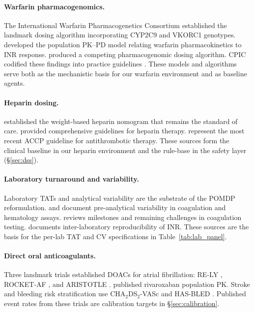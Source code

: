 \documentclass[11pt]{article}
\begin{document}
\paragraph{Warfarin pharmacogenomics.}
The International Warfarin Pharmacogenetics Consortium \citep{iwpc2009} established the landmark dosing algorithm incorporating CYP2C9 and VKORC1 genotypes. \citet{hamberg2007, hamberg2010} developed the population PK--PD model relating warfarin pharmacokinetics to INR response. \citet{gage2008} produced a competing pharmacogenomic dosing algorithm. CPIC codified these findings into practice guidelines \citep{johnson2017}. These models and algorithms serve both as the mechanistic basis for our warfarin environment and as baseline agents.

\paragraph{Heparin dosing.}
\citet{raschke1993} established the weight-based heparin nomogram that remains the standard of care. \citet{hirsh2001} provided comprehensive guidelines for heparin therapy. \citet{holbrook2012} represent the most recent ACCP guideline for antithrombotic therapy. These sources form the clinical baseline in our heparin environment and the rule-base in the safety layer (\S\ref{sec:dss}).

\paragraph{Laboratory turnaround and variability.}
Laboratory TATs and analytical variability are the substrate of the POMDP reformulation. \citet{bowen2016} and \citet{whitehead2020} document pre-analytical variability in coagulation and hematology assays. \citet{lippi2012} reviews milestones and remaining challenges in coagulation testing. \citet{vandenbesselaar2010} documents inter-laboratory reproducibility of INR. These sources are the basis for the per-lab TAT and CV specifications in Table~\ref{tab:lab_panel}.

\paragraph{Direct oral anticoagulants.}
Three landmark trials established DOACs for atrial fibrillation: RE-LY \citep{connolly2009}, ROCKET-AF \citep{patel2011}, and ARISTOTLE \citep{granger2011}. \citet{mueck2007} published rivaroxaban population PK. Stroke and bleeding risk stratification use CHA$_2$DS$_2$-VASc \citep{lip2010} and HAS-BLED \citep{pisters2010}. Published event rates from these trials are calibration targets in \S\ref{sec:calibration}.
\end{document}
